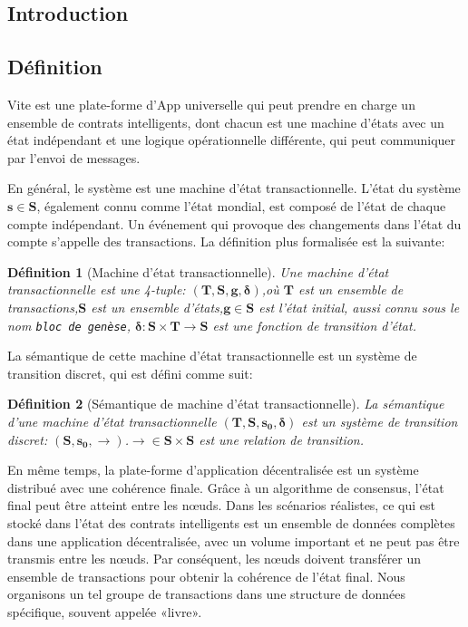 \documentclass[UTF8,nofonts]{article}
\newtheorem{definition}{Définition}[section]
\begin{document}
\begin{multicols}{2}

\section{Introduction}
\subsection{Définition}

Vite est une plate-forme d'App universelle qui peut prendre en charge un ensemble de contrats intelligents, dont chacun est une machine d'états avec un état indépendant et une logique opérationnelle différente, qui peut communiquer par l'envoi de messages.

En général, le système est une machine d'état transactionnelle. L'état du système $\boldsymbol{s} \in \boldsymbol{S}$, également connu comme l'état mondial, est composé de l'état de chaque compte indépendant. Un événement qui provoque des changements dans l'état du compte s'appelle des transactions. La définition plus formalisée est la suivante:

\begin{definition}[Machine d'état transactionnelle] \label{def:fsm}
Une machine d'état transactionnelle est une 4-tuple: $(\boldsymbol{T},\boldsymbol{S},\boldsymbol{g},\boldsymbol{{\delta}})$,où $\boldsymbol{T}$ est un ensemble de transactions,$\boldsymbol{S}$ est un ensemble d'états,$\boldsymbol{g} \in \boldsymbol{S}$ est l'état initial, aussi connu sous le nom \texttt{bloc de genèse}, $\boldsymbol{{\delta}:\boldsymbol{S}\times\boldsymbol{T}\rightarrow\boldsymbol{S}}$ est une fonction de transition d'état.
\end{definition}

La sémantique de cette machine d'état transactionnelle est un système de transition discret, qui est défini comme suit:
\begin{definition}[Sémantique de machine d'état transactionnelle] \label{def:Sémantique}
La sémantique d'une machine d'état transactionnelle $(\boldsymbol{T},\boldsymbol{S},\boldsymbol{s_{0}},\boldsymbol{{\delta}})$ est un système de transition discret:  $(\boldsymbol{S},\boldsymbol{s_{0}},\boldsymbol{\rightarrow})$.$\boldsymbol{\rightarrow} \in \boldsymbol{S}\times\boldsymbol{S}$ est une relation de transition.
\end{definition}

En même temps, la plate-forme d'application décentralisée est un système distribué avec une cohérence finale. Grâce à un algorithme de consensus, l'état final peut être atteint entre les nœuds. Dans les scénarios réalistes, ce qui est stocké dans l'état des contrats intelligents est un ensemble de données complètes dans une application décentralisée, avec un volume important et ne peut pas être transmis entre les nœuds. Par conséquent, les nœuds doivent transférer un ensemble de transactions pour obtenir la cohérence de l'état final. Nous organisons un tel groupe de transactions dans une structure de données spécifique, souvent appelée «livre».


\end{multicols}
\end{document}
